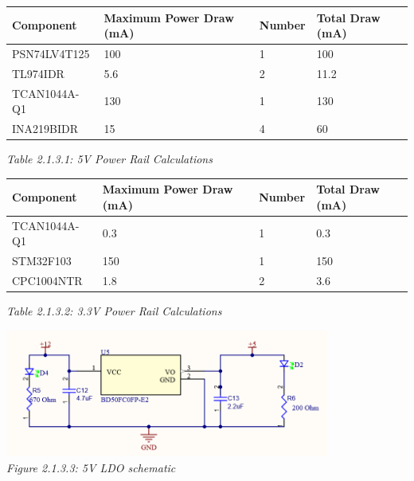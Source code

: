 \begin{center}
    \begin{tabular}{|l|l|l|l|}
        \hline
        \bf Component            & \bf Maximum Power Draw (mA) & \bf Number & \bf Total Draw (mA) \\
        \hline
        PSN74LV4T125 \cite{ref1} & 100                         & 1          & 100                 \\
        \hline
        TL974IDR \cite{ref2}     & 5.6                         & 2          & 11.2                \\
        \hline
        TCAN1044A-Q1 \cite{ref3}         & 130                         & 1          & 130                 \\
        \hline
        INA219BIDR \cite{ref4}           & 15                          & 4          & 60                  \\
        \hline
    \end{tabular}

    \it Table 2.1.3.1: 5V Power Rail Calculations
    \vspace{\baselineskip}

    \begin{tabular}{|l|l|l|l|}
        \hline
        \bf Component    & \bf Maximum Power Draw (mA) & \bf Number & \bf Total Draw (mA) \\
        \hline
        TCAN1044A-Q1 \cite{ref3} & 0.3                         & 1          & 0.3                 \\
        \hline
        STM32F103 \cite{ref5}    & 150                         & 1          & 150                 \\
        \hline
        CPC1004NTR \cite{ref6}   & 1.8                         & 2          & 3.6                 \\
        \hline
    \end{tabular}

    \it Table 2.1.3.2: 3.3V Power Rail Calculations
    \vspace{\baselineskip}

    \includegraphics[width=0.8\textwidth]{images/5V_ldo_schematic.png}\\
    \it Figure 2.1.3.3: 5V LDO schematic\\
    \vspace{\baselineskip}


\end{center}
